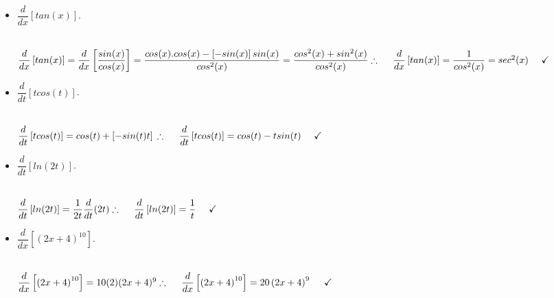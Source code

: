 \documentclass[fleqn]{article}
\begin{document}
\begin{enumerate}
\begin{itemize}
      \item $\dfrac{d}{dx} \left[tan(x)\right]$.

        \textcolor{hwColor}{
          \\
          $
            \dfrac{d}{dx} \left[tan(x)\right]=\dfrac{d}{dx} \left[\dfrac{sin(x)}{cos(x)}\right]
            =\dfrac{cos(x).cos(x)-\left[-sin(x)\right]sin(x)}{cos^2(x)}
            =\dfrac{cos^2(x)+sin^2(x)}{cos^2(x)}
            \\
            \\
            \\
            \therefore ~~~~ \dfrac{d}{dx} \left[tan(x)\right]=\dfrac{1}{cos^2(x)}=sec^2(x) ~~~~ \checkmark
          $
        }

      \item $\dfrac{d}{dt} \left[t cos(t)\right]$.

        \textcolor{hwColor}{
          \\
          $
            \dfrac{d}{dt} \left[t cos(t)\right]=cos(t)+\left[-sin(t)t\right]
            \\
            \\
            \\
            \therefore ~~~~ \dfrac{d}{dt} \left[t cos(t)\right]=cos(t)-tsin(t) ~~~~ \checkmark
            \\
          $
        }

      \item $\dfrac{d}{dt} \left[ln(2t)\right]$.

        \textcolor{hwColor}{
          \\
          $
            \dfrac{d}{dt} \left[ln(2t)\right]=\dfrac{1}{2t} \dfrac{d}{dt} (2t)
            \\
            \\
            \\
            \therefore ~~~~ \dfrac{d}{dt} \left[ln(2t)\right]=\dfrac{1}{t} ~~~~ \checkmark
            \\
          $
        }

      \item $\dfrac{d}{dx} \left[\left(2x+4\right)^{10}\right]$.

        \textcolor{hwColor}{
          \\
          $
            \dfrac{d}{dx} \left[\left(2x+4\right)^{10}\right]=10(2)(2x+4)^9
            \\
            \\
            \\
            \therefore ~~~~ \dfrac{d}{dx} \left[\left(2x+4\right)^{10}\right]=20\left(2x+4\right)^9 ~~~~ \checkmark
            \\
          $
        }


\end{itemize}
\end{enumerate}
\end{document}

